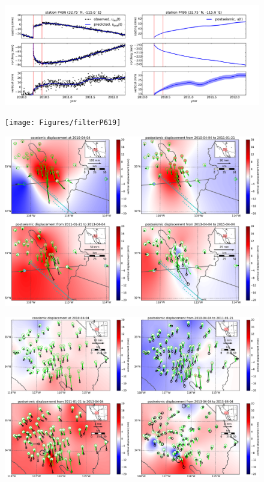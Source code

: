 \documentclass[12pt]{article}
\begin{document}
\begin{figure}
\includegraphics[scale=0.45]{Figures/filterP496}
\centering
\caption{}
\label{fig:P496}
\end{figure}

\begin{figure}
\texttt{[image: Figures/filterP619]}
\centering
\caption{} 
\label{fig:P619}
\end{figure}

\begin{figure}
\includegraphics[scale=0.4]{Figures/nearfield}
\centering 
\caption{}
\label{fig:NearField}
\end{figure}

\begin{figure}
\includegraphics[scale=0.4]{Figures/farfield}
\centering 
\caption{}
\label{fig:FarField}
\end{figure}
\end{document}
